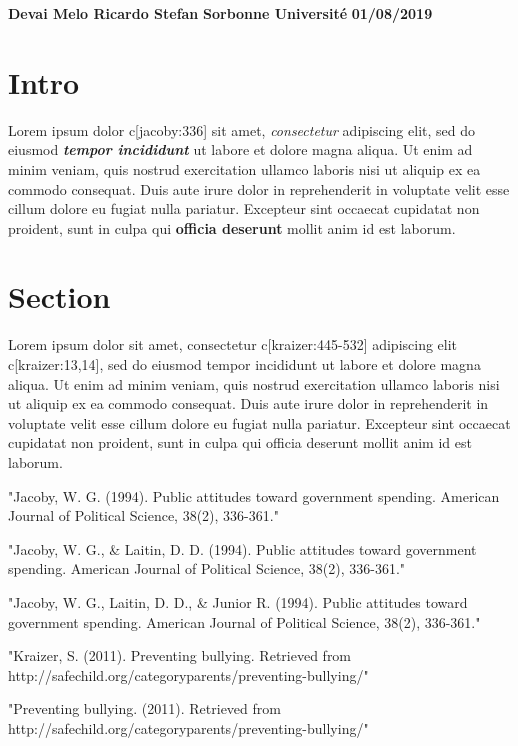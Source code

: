 \documentclass[12pt]{article}
\begin{document}
\begin{flushright}
\textbf{Devai Melo Ricardo Stefan}
\linebreak
\textbf{Sorbonne Université}
\linebreak
\textbf{01/08/2019}
\linebreak
\end{flushright}

\section*{Intro}
Lorem ipsum dolor c[jacoby:336] sit amet, \emph{consectetur} adipiscing elit, sed do eiusmod \emph{\textbf{tempor incididunt}} ut labore et dolore magna aliqua. Ut enim ad minim veniam, quis nostrud exercitation ullamco laboris nisi ut aliquip ex ea commodo consequat. Duis aute irure dolor in reprehenderit in voluptate velit esse cillum dolore eu fugiat nulla pariatur. Excepteur sint occaecat cupidatat non proident, sunt in culpa qui \textbf{officia deserunt} mollit anim id est laborum.

\section*{Section}
Lorem ipsum dolor sit amet, consectetur c[kraizer:445-532] adipiscing elit c[kraizer:13,14], sed do eiusmod tempor incididunt ut labore et dolore magna aliqua. Ut enim ad minim veniam, quis nostrud exercitation ullamco laboris nisi ut aliquip ex ea commodo consequat. Duis aute irure dolor in reprehenderit in voluptate velit esse cillum dolore eu fugiat nulla pariatur. Excepteur sint occaecat cupidatat non proident, sunt in culpa qui officia deserunt mollit anim id est laborum.

"Jacoby, W. G. (1994). Public attitudes toward government spending. American Journal of Political Science, 38(2), 336-361."

"Jacoby, W. G., & Laitin, D. D. (1994). Public attitudes toward government spending. American Journal of Political Science, 38(2), 336-361."

"Jacoby, W. G., Laitin, D. D., & Junior R. (1994). Public attitudes toward government spending. American Journal of Political Science, 38(2), 336-361."

"Kraizer, S. (2011). Preventing bullying. Retrieved from http://safechild.org/categoryparents/preventing-bullying/"

"Preventing bullying. (2011). Retrieved from http://safechild.org/categoryparents/preventing-bullying/"
\end{document}
